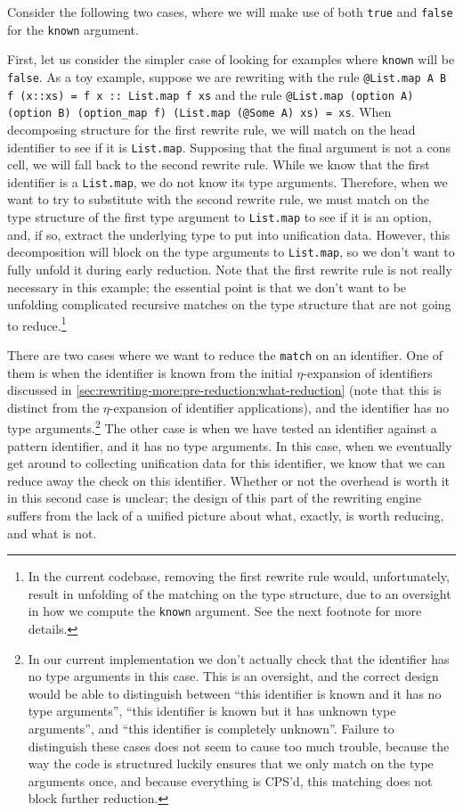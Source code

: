 Consider the following two cases, where we will make use of both \texttt{true} and \texttt{false} for the \texttt{known} argument.

First, let us consider the simpler case of looking for examples where \texttt{known} will be \texttt{false}.
As a toy example, suppose we are rewriting with the rule \texttt{@List.map A B f (x::xs) = f x :: List.map f xs} and the rule \texttt{@List.map (option A) (option B) (option_map f) (List.map (@Some A) xs) = xs}.
When decomposing structure for the first rewrite rule, we will match on the head identifier to see if it is \texttt{List.map}.
Supposing that the final argument is not a cons cell, we will fall back to the second rewrite rule.
While we know that the first identifier is a \texttt{List.map}, we do not know its type arguments.
Therefore, when we want to try to substitute with the second rewrite rule, we must match on the type structure of the first type argument to \texttt{List.map} to see if it is an option, and, if so, extract the underlying type to put into unification data.
However, this decomposition will block on the type arguments to \texttt{List.map}, so we don't want to fully unfold it during early reduction.
Note that the first rewrite rule is not really necessary in this example; the essential point is that we don't want to be unfolding complicated recursive matches on the type structure that are not going to reduce.\footnote{%
  In the current codebase, removing the first rewrite rule would, unfortunately, result in unfolding of the matching on the type structure, due to an oversight in how we compute the \texttt{known} argument.
  See the next footnote for more details.%
}

There are two cases where we want to reduce the \texttt{match} on an identifier.
One of them is when the identifier is known from the initial $\eta$-expansion of identifiers discussed in \autoref{sec:rewriting-more:pre-reduction:what-reduction} (note that this is distinct from the $\eta$-expansion of identifier applications), and the identifier has no type arguments.\footnote{%
  In our current implementation we don't actually check that the identifier has no type arguments in this case.
  This is an oversight, and the correct design would be able to distinguish between ``this identifier is known and it has no type arguments'', ``this identifier is known but it has unknown type arguments'', and ``this identifier is completely unknown''.
  Failure to distinguish these cases does not seem to cause too much trouble, because the way the code is structured luckily ensures that we only match on the type arguments once, and because everything is CPS'd, this matching does not block further reduction.%
}
The other case is when we have tested an identifier against a pattern identifier, and it has no type arguments.
In this case, when we eventually get around to collecting unification data for this identifier, we know that we can reduce away the check on this identifier.
Whether or not the overhead is worth it in this second case is unclear; the design of this part of the rewriting engine suffers from the lack of a unified picture about what, exactly, is worth reducing, and what is not.

